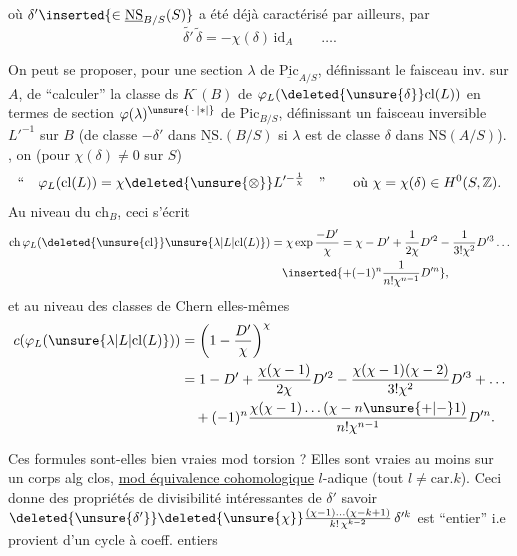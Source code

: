 où $\delta'\inserted{\in\underline{\mathrm{NS}}_{B/S}(S)}$ a été déjà caractérisé par ailleurs, par
\[
\widetilde{\delta'}\,\widetilde\delta=-\chi(\delta)\,\mathrm{id}_A\qquad\ldots.
\]

On peut se proposer, pour une section $\lambda$ de $\underline{\mathrm{Pic}}_{A/S}$, définissant le faisceau inv. sur $A$, de ``calculer'' la classe ds $K^{\cdot}(B)$ de $\varphi_L(\deleted{\unsure{\delta}}\mathrm{cl}(L))$ en termes de   section $\varphi(\lambda)^{\unsure{\,\cdot\,|*|\vphantom{*}}}$ de $\mathrm{Pic}_{B/S}$, définissant un faisceau inversible $L'^{-1}$ sur $B$ (de classe $-\delta'$ dans $\underline{\mathrm{NS}}.(B/S)$ si $\lambda$ est de classe $\delta$ dans $\mathrm{NS}(A/S)$). , on   (pour $\chi(\delta)\ne0$  sur $S$)
\[
\text{``}\quad\varphi_L(\mathrm{cl}(L))=\chi\deleted{\unsure{\otimes}}L'^{-\frac1\chi}\quad\text{''}
\qquad\text{où }\chi=\chi(\delta)\in H^0(S,\mathbb Z).
\]
Au niveau du $\mathrm{ch}_B$, ceci s'écrit
\[
\begin{aligned}
\mathrm{ch}\,\varphi_L(\deleted{\unsure{\mathrm{cl}}}\unsure{\lambda|L|\mathrm{cl}(L)})&=\chi\exp\frac{-D'}{\chi}=\chi-D'+\frac1{2\chi}D'^{2}-\frac1{3!\chi^2}D'^{3}\ldots\\
&\quad\inserted{+(-1)^n\frac1{n!\chi^{n-1}}D'^{n}},
\end{aligned}
\]
et au niveau des classes de Chern elles-mêmes
\[
\begin{aligned}
c(\varphi_L(\unsure{\lambda|L|\mathrm{cl}(L)}))&=\left(1-\frac{D'}{\chi}\right)^\chi\\
&=1-D'+\frac{\chi(\chi-1)}{2\chi}D'^{2}-\frac{\chi(\chi-1)(\chi-2)}{3!\chi^2}D'^{3}+\ldots\\
&\quad+(-1)^n\frac{\chi(\chi-1)\ldots(\chi-n\unsure{+|-}1)}{n!\chi^{n-1}}D'^{n}.
\end{aligned}
\]

Ces formules sont-elles bien vraies mod torsion ? Elles sont vraies au moins sur un corps alg clos, \uline{mod \uline{équivalence} cohomologique} $l$-adique (tout $l\ne\mathrm{car}.k$). Ceci donne des \margin{!} propriétés de divisibilité intéressantes de $\delta'$ savoir $\deleted{\unsure{\delta'}}\deleted{\unsure{\chi}}\frac{(\chi-1)\ldots(\chi-k+1)}{k!\,\chi^{k-2}}\,\delta'^{k}$ est ``entier'' i.e provient d'un cycle à coeff. entiers
